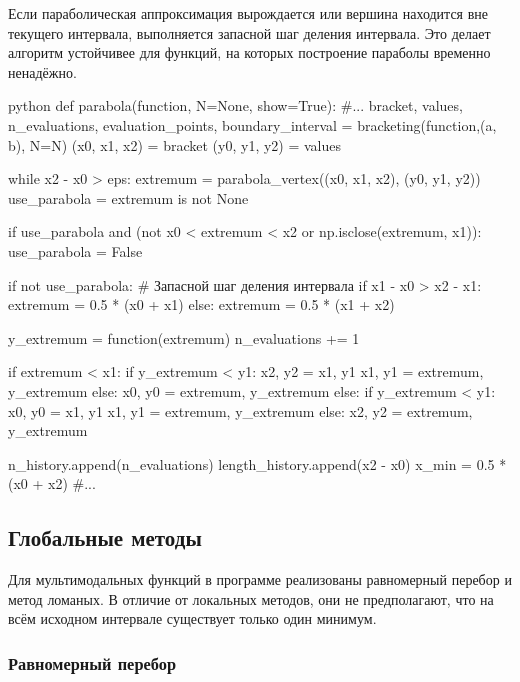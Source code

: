 Если параболическая аппроксимация вырождается или вершина находится вне текущего
интервала, выполняется запасной шаг деления интервала. Это делает алгоритм
устойчивее для функций, на которых построение параболы временно ненадёжно.

\newpage

\begin{mintedbox}{python}
def parabola(function, N=None, show=True):
    #...
    bracket, values, n_evaluations, evaluation_points, boundary_interval = bracketing(function,(a, b), N=N)
    (x0, x1, x2) = bracket
    (y0, y1, y2) = values

    while x2 - x0 > eps:
        extremum = parabola_vertex((x0, x1, x2), (y0, y1, y2))
        use_parabola = extremum is not None

        if use_parabola and (not x0 < extremum < x2 or np.isclose(extremum, x1)):
            use_parabola = False

        if not use_parabola: # Запасной шаг деления интервала
            if x1 - x0 > x2 - x1:
                extremum = 0.5 * (x0 + x1)
            else:
                extremum = 0.5 * (x1 + x2)

        y_extremum = function(extremum)
        n_evaluations += 1

        if extremum < x1:
            if y_extremum < y1:
                x2, y2 = x1, y1
                x1, y1 = extremum, y_extremum
            else:
                x0, y0 = extremum, y_extremum
        else:
            if y_extremum < y1:
                x0, y0 = x1, y1
                x1, y1 = extremum, y_extremum
            else:
                x2, y2 = extremum, y_extremum

        n_history.append(n_evaluations)
        length_history.append(x2 - x0)
    x_min = 0.5 * (x0 + x2)
    #...
\end{mintedbox}

\subsection{Глобальные методы}

Для мультимодальных функций в программе реализованы равномерный перебор
и метод ломаных. В отличие от локальных методов, они не предполагают, что
на всём исходном интервале существует только один минимум.

\subsubsection{Равномерный перебор}

